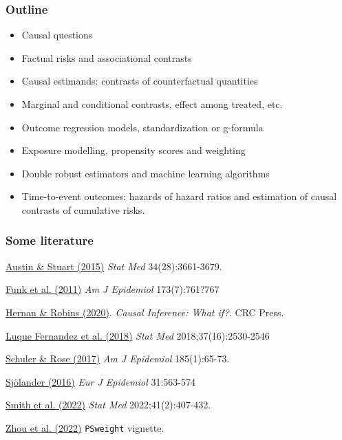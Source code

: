 \documentclass[12pt,dvipsnames,t,aspectratio=169, handout%
]{beamer}
\begin{document}
\begin{frame}
\frametitle{Outline}

\begin{itemize}

\item Causal questions
\medskip
\item Factual risks and associational contrasts 
\medskip
\item Causal estimands: contrasts of counterfactual quantities
\medskip
\item Marginal and conditional contrasts, effect among treated, etc.
\medskip
\item Outcome regression models, standardization or g-formula
\medskip
\item Exposure modelling, propensity scores and weighting 
\medskip
\item Double robust estimators and machine learning algorithms
\medskip
\item Time-to-event outcomes: hazards of hazard ratios and estimation
of causal contrasts of cumulative risks. 

\end{itemize}

\end{frame}

\begin{frame}
\frametitle{\large Some literature}
\bi
\item \href{https://doi.org/10.1002/sim.6607}{\color{blue}Austin \& Stuart (2015)} {\it Stat Med} 34(28):3661-3679.
\medskip 
\item
\href{https://doi.org/10.1093/aje/kwq439}{\color{blue} Funk et al. (2011)} {\it Am J Epidemiol}  173(7):761?767
\medskip
\item
\href{https://www.hsph.harvard.edu/miguel-hernan/causal-inference-book/}
{\color{blue}Hernan \& Robins (2020)}. \textit{Causal Inference: What if?}. CRC Press.
\medskip
\item
\href{https://doi.org/10.1002/sim.7628}{\color{blue}Luque Fernandez et al. (2018)}
{\it Stat Med} 2018;37(16):2530-2546
\medskip
\item
\href{https://doi.org/10.1093/aje/kww165}{\color{blue}Schuler \& Rose (2017)} \textit{Am J Epidemiol} 185(1):65-73.
\medskip
\item 
 \href{https://doi.org/10.1007/s10654-016-0157-3}{\color{blue}Sj{\"o}lander (2016)} {\it Eur J Epidemiol} 31:563-574
\medskip
\item
\href{https://doi.org/10.1002/sim.9234}{\color{blue}Smith et al. (2022)} {\it Stat Med} 2022;41(2):407-432.
\medskip
\item
\href{https://cran.r-project.org/web/packages/PSweight/vignettes/vignette.pdf}{\color{blue}Zhou et al. (2022)} \texttt{PSweight} vignette.

\ei

\end{frame}
\end{document}
